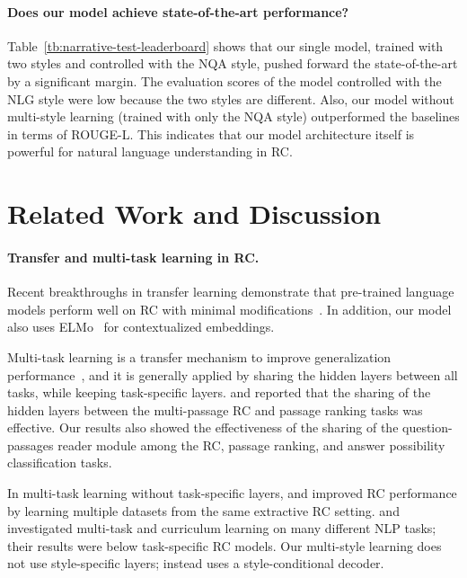\documentclass[11pt,a4paper]{article}
\theoremstyle{mydef}
\theoremstyle{myprob}
\begin{document}
\paragraph{Does our model achieve state-of-the-art performance?} 
Table~\ref{tb:narrative-test-leaderboard} shows that 
our single model, trained with two styles
and controlled with the NQA style, %
pushed forward the
state-of-the-art by a significant margin. 
The evaluation scores of the model controlled with the NLG style were low because the two styles are different. 
Also, our model without multi-style learning (trained with only the NQA style) outperformed the baselines
in terms of ROUGE-L. 
This indicates that our model architecture itself is powerful for natural language understanding in RC.

\section{Related Work and Discussion}

\paragraph{Transfer and multi-task learning in RC.}

Recent breakthroughs in transfer learning demonstrate that 
pre-trained language models 
perform well on RC
with minimal modifications~\citep{PetersNIGCLZ18,DevlinCLT18,RadfordNSS18,Radford19}. 
In addition, our model also uses ELMo~\citep{PetersNIGCLZ18} for contextualized embeddings.

Multi-task learning is a transfer mechanism to improve generalization performance~\citep{Caruana97}, and it is generally applied by sharing the hidden layers between all tasks, while keeping task-specific layers.
\citet{WangAAAI2018} and \citet{NishidaSOAT18} reported that 
the sharing of the hidden layers between the multi-passage RC and passage ranking tasks was effective.
Our results also showed the effectiveness of 
the sharing of the question-passages reader 
module among the RC, passage ranking, and answer possibility classification tasks.

In multi-task learning without task-specific layers,
\citet{DevlinCLT18} and \citet{ChenFWB17} improved RC performance by learning multiple datasets from the same extractive RC
setting. 
\citet{McCannKXS18} and \citet{Yogatama19} investigated multi-task and curriculum learning 
on many different NLP tasks; their results were below task-specific RC models.
Our multi-style learning does not use style-specific layers; instead uses a style-conditional decoder. 
\end{document}
